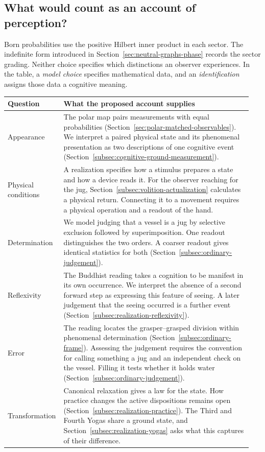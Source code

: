 \documentclass[11pt]{article}
\theoremstyle{definition}
\begin{document}
\noindent\begin{minipage}{\linewidth}
\subsection*{What would count as an account of perception?}
Born probabilities use the positive Hilbert inner product in each sector. The indefinite form introduced in Section~\ref{sec:neutral-graphs-phase} records the sector grading. Neither choice specifies which distinctions an observer experiences. In the table, a \emph{model choice} specifies mathematical data, and an \emph{identification} assigns those data a cognitive meaning.
\begin{center}
\small
\begin{tabular}{@{}p{0.19\linewidth}p{0.76\linewidth}@{}}
\toprule
Question & What the proposed account supplies \\
\midrule
Appearance & The polar map pairs measurements with equal probabilities (Section~\ref{sec:polar-matched-observables}). We interpret a paired physical state and its phenomenal presentation as two descriptions of one cognitive event (Section~\ref{subsec:cognitive-ground-measurement}). \\[4pt]
Physical conditions & A realization specifies how a stimulus prepares a state and how a device reads it. For the observer reaching for the jug, Section~\ref{subsec:volition-actualization} calculates a physical return. Connecting it to a movement requires a physical operation and a readout of the hand. \\[4pt]
Determination & We model judging that a vessel is a jug by selective exclusion followed by superimposition. One readout distinguishes the two orders. A coarser readout gives identical statistics for both (Section~\ref{subsec:ordinary-judgement}). \\[4pt]
Reflexivity & The Buddhist reading takes a cognition to be manifest in its own occurrence. We interpret the absence of a second forward step as expressing this feature of seeing. A later judgement that the seeing occurred is a further event (Section~\ref{subsec:realization-reflexivity}). \\[4pt]
Error & The reading locates the grasper--grasped division within phenomenal determination (Section~\ref{subsec:ordinary-frame}). Assessing the judgement requires the convention for calling something a jug and an independent check on the vessel. Filling it tests whether it holds water (Section~\ref{subsec:ordinary-judgement}). \\[4pt]
Transformation & Canonical relaxation gives a law for the state. How practice changes the active dispositions remains open (Section~\ref{subsec:realization-practice}). The Third and Fourth Yogas share a ground state, and Section~\ref{subsec:realization-yogas} asks what this captures of their difference. \\
\bottomrule
\end{tabular}
\end{center}
\end{minipage}
\end{document}
